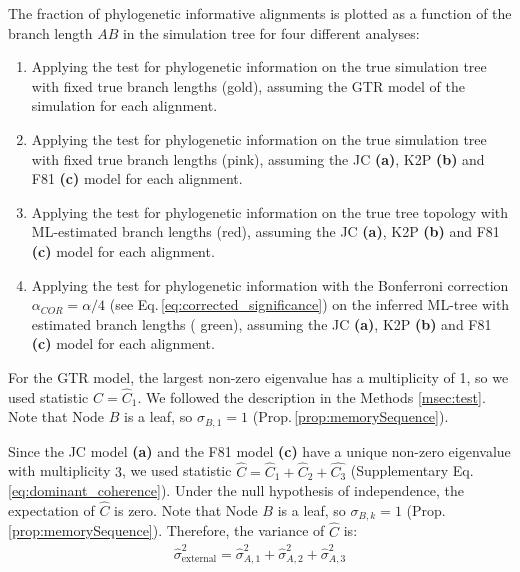 \begin{appendices}
\medskip
The fraction of phylogenetic informative alignments is plotted as a function of the branch length $AB$ in the simulation tree for four different analyses:

\medskip

\begin{enumerate}
\item  Applying the test for phylogenetic information on the true simulation tree with fixed true branch lengths ({\color{truetreeNoMisspecification}gold}), assuming the GTR model of the simulation for each alignment. 
\item Applying the test for phylogenetic information on the true simulation tree with fixed true branch lengths ({\color{truetree}pink}), assuming the JC \textbf{(a)}, K2P \textbf{(b)} and F81 \textbf{(c)} model for each alignment. 
\item Applying the test for phylogenetic information on the true tree topology with ML-estimated branch lengths ({\color{truetreeML}red}), assuming the JC \textbf{(a)}, K2P \textbf{(b)} and F81 \textbf{(c)} model for each alignment.
\item Applying the test for phylogenetic information with the  Bonferroni correction $\alpha_{COR} = \alpha/4$ (see Eq.\,\eqref{eq:corrected_significance}) on the inferred ML-tree with estimated branch lengths ({\color{MLtreeBonferroni} green}), assuming the JC \textbf{(a)}, K2P \textbf{(b)} and F81 \textbf{(c)}  model for each alignment.
\end{enumerate}


\medskip
For the GTR model, the largest non-zero eigenvalue has a multiplicity of
1, so we used statistic $\hat C = \hat{C}_1$. We followed the description in the Methods \ref{msec:test}. Note that Node $B$ is a leaf, so $\sigma_{B,1}=1$ (Prop.\,\ref{prop:memorySequence}).

\medskip

Since the JC model \textbf{(a)} and the F81 model \textbf{(c)} have a unique non-zero eigenvalue with multiplicity $3$, we used statistic $\hat{C} = \hat{C}_1+\hat{C}_2+\hat{C_3}$ (Supplementary Eq.\,\eqref{eq:dominant_coherence}).  Under the null hypothesis of independence, the expectation of $\hat{C}$ is zero. Note that Node $B$ is a leaf, so $\sigma_{B,k}=1$ (Prop.\,\ref{prop:memorySequence}). Therefore, the variance of $\hat C$ is:
\begin{align*}
  \hat{\sigma}^2_{\text{external}} =  \hat{\sigma}^2_{A,1}+\hat{\sigma}^2_{A,2}+\hat{\sigma}^2_{A,3}
\end{align*}


\end{appendices}
